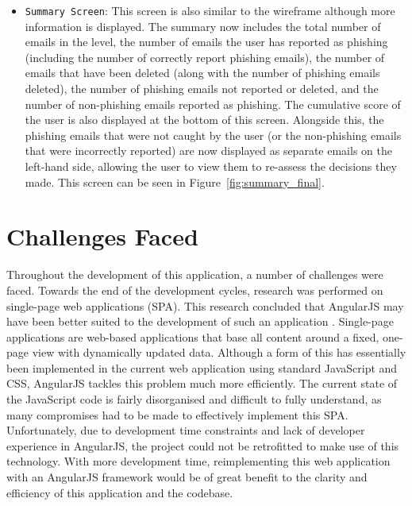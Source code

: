 \documentclass{l4proj}
\begin{document}
\begin{itemize}
\begin{itemize}
    \end{itemize}
  \item \verb|Summary Screen|: This screen is also similar to the wireframe although more information is displayed. The summary now includes the total number of emails in the level, the number of emails the user has reported as phishing (including the number of correctly report phishing emails), the number of emails that have been deleted (along with the number of phishing emails deleted), the number of phishing emails not reported or deleted, and the number of non-phishing emails reported as phishing. The cumulative score of the user is also displayed at the bottom of this screen. Alongside this, the phishing emails that were not caught by the user (or the non-phishing emails that were incorrectly reported) are now displayed as separate emails on the left-hand side, allowing the user to view them to re-assess the decisions they made. This screen can be seen in Figure~\ref{fig:summary_final}.
\end{itemize}

\section{Challenges Faced}
Throughout the development of this application, a number of challenges were faced. Towards the end of the development cycles, research was performed on single-page web applications (SPA). This research concluded that AngularJS may have been better suited to the development of such an application \citep{jadhav2015single}. Single-page applications are web-based applications that base all content around a fixed, one-page view with dynamically updated data. Although a form of this has essentially been implemented in the current web application using standard JavaScript and CSS, AngularJS tackles this problem much more efficiently. The current state of the JavaScript code is fairly disorganised and difficult to fully understand, as many compromises had to be made to effectively implement this SPA. Unfortunately, due to development time constraints and lack of developer experience in AngularJS, the project could not be retrofitted to make use of this technology. With more development time, reimplementing this web application with an AngularJS framework would be of great benefit to the clarity and efficiency of this application and the codebase.
\end{document}
